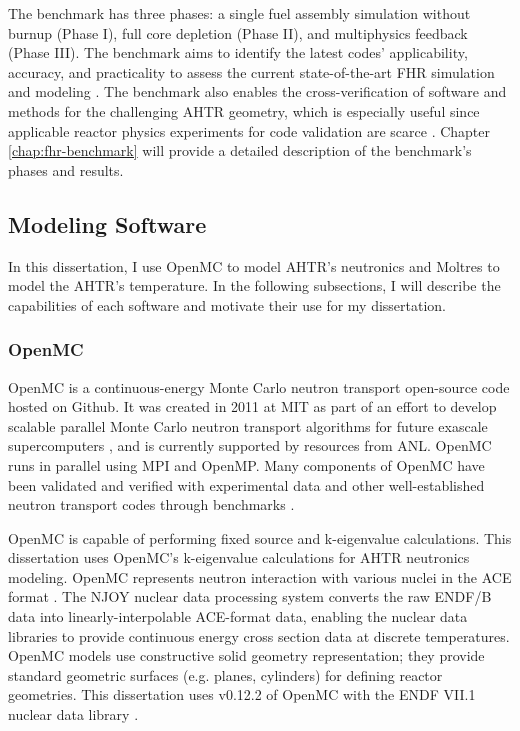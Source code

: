 The benchmark has three phases: a single fuel assembly simulation 
without burnup (Phase I), full core depletion (Phase II), and multiphysics 
feedback (Phase III). 
The benchmark aims to identify the latest codes' applicability, accuracy, 
and practicality to assess the current state-of-the-art FHR simulation 
and modeling \cite{petrovic_preliminary_2021}. 
The benchmark also enables the cross-verification of software and methods 
for the challenging \gls{AHTR} geometry, which is especially useful since 
applicable reactor physics experiments for code validation are scarce 
\cite{petrovic_fhrahtr_2019,petrovic_preliminary_2021}. 
Chapter \ref{chap:fhr-benchmark} will provide a detailed description of the 
benchmark's phases and results.

\subsection{Modeling Software}
\label{sec:lit-review-modeling-software}
In this dissertation, I use OpenMC \cite{romano_openmc:_2015} to model \gls{AHTR}'s 
neutronics and Moltres \cite{lindsay_introduction_2018} to model the \gls{AHTR}'s 
temperature. 
In the following subsections, I will describe the capabilities of each software 
and motivate their use for my dissertation. 

\subsubsection{OpenMC}
OpenMC \cite{romano_openmc:_2015} is a continuous-energy Monte Carlo neutron transport 
open-source code hosted on Github.
It was created in 2011 at \gls{MIT} as part of an effort to develop scalable parallel 
Monte Carlo neutron transport algorithms for future exascale supercomputers 
\cite{romano_openmc:_2015}, and is currently supported by resources from \gls{ANL}. 
OpenMC runs in parallel using \gls{MPI} and OpenMP. 
Many components of OpenMC have been validated and verified with experimental data 
and other well-established neutron transport codes through benchmarks 
\cite{romano_openmc:_2015}. 

OpenMC is capable of performing fixed source and k-eigenvalue calculations. 
This dissertation uses OpenMC's k-eigenvalue calculations for \gls{AHTR} neutronics 
modeling.
OpenMC represents neutron interaction with various nuclei in the ACE format 
\cite{x-5_monte_carlo_team_mcnp_2003}.
The NJOY nuclear data processing system \cite{macfarlane_njoy_2017} converts the 
raw ENDF/B data into linearly-interpolable ACE-format data, enabling the nuclear 
data libraries to provide continuous energy cross section data at discrete temperatures.
OpenMC models use constructive solid geometry representation; they provide standard 
geometric surfaces (e.g. planes, cylinders) for defining reactor geometries.  
This dissertation uses v0.12.2 of OpenMC with the ENDF VII.1 nuclear data library
\cite{chadwick_endf/b-vii.1_2011}. 


